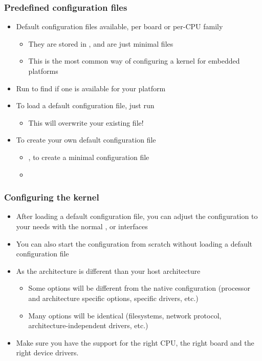 \begin{frame}
  \frametitle{Predefined configuration files}
  \begin{itemize}
  \item Default configuration files available, per board or per-CPU
    family
    \begin{itemize}
    \item They are stored in , and are
      just minimal  files
    \item This is the most common way of configuring a kernel for
      embedded platforms
    \end{itemize}
  \item Run  to find if one is available for your
    platform
  \item To load a default configuration file, just run\\
    \begin{itemize}
    \item This will overwrite your existing  file!
    \end{itemize}
  \item To create your own default configuration file
    \begin{itemize}
    \item {}, to create a minimal
      configuration file
    \item {}
    \end{itemize}
  \end{itemize}
\end{frame}

\begin{frame}
  \frametitle{Configuring the kernel}
  \begin{itemize}
  \item After loading a default configuration file, you can adjust the
    configuration to your needs with the normal ,
     or  interfaces
  \item You can also start the configuration from scratch without
    loading a default configuration file
  \item As the architecture is different than your host architecture
    \begin{itemize}
    \item Some options will be different from the native configuration
      (processor and architecture specific options, specific drivers,
      etc.)
    \item Many options will be identical (filesystems, network
      protocol, architecture-independent drivers, etc.)
    \end{itemize}
  \item Make sure you have the support for the right CPU, the right
    board and the right device drivers.
  \end{itemize}
\end{frame}

